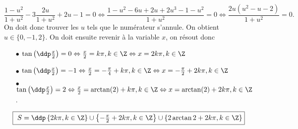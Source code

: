 \begin{correction}
\begin{enumerate}
$$\frac{1-u^2}{1+u^2} - 3 \frac{2u}{1+u^2} + 2u - 1 = 0 \Leftrightarrow \frac{1-u^2- 6u + 2u +2u^3-1-u^2}{1+u^2} = 0   \Leftrightarrow \frac{2u(u^2-u-2)}{1+u^2}  = 0.$$
On doit donc trouver les $u$ tels que le num\'erateur s'annule. On obtient $u \in \{0,-1, 2\}$. On doit ensuite revenir \`a la variable $x$, on r\'esout donc 
\begin{itemize}
\item[$\bullet$] $\tan\left( \ddp \frac{x}{2} \right) = 0 \Leftrightarrow \frac{x}{2} = k \pi, k \in \Z \Leftrightarrow  x = 2k\pi, k \in \Z$ 
\item[$\bullet$] $\tan\left( \ddp \frac{x}{2} \right) = -1\Leftrightarrow \frac{x}{2} = - \frac{\pi}{4} + k \pi, k \in \Z \Leftrightarrow  x = - \frac{\pi}{2} +2k\pi, k \in \Z$ 
\item[$\bullet$] $\tan\left( \ddp \frac{x}{2} \right) = 2 \Leftrightarrow \frac{x}{2} = \arctan(2) + k \pi, k \in \Z \Leftrightarrow  x = \arctan(2)  +2k\pi, k \in \Z$.
\end{itemize}
$$\fbox{ $ S = \ddp \left\{2 k \pi, k \in \Z \right\} \cup  \left\{-\frac{\pi}{2} + 2 k\pi, k \in \Z \right\} \cup \left\{2\arctan 2 + 2 k \pi, k \in \Z \right\} $}$$
\end{enumerate}
\end{correction}

\vspace*{1cm}

